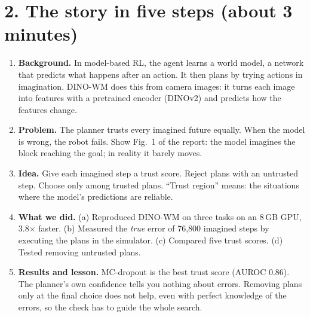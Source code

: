 \documentclass[11pt,a4paper]{article}
\begin{document}
\section*{2. The story in five steps (about 3 minutes)}
\begin{enumerate}
\item \textbf{Background.} In model-based RL, the agent learns a world model, a network that predicts what happens
after an action. It then plans by trying actions in imagination. DINO-WM does this from camera images: it turns each
image into features with a pretrained encoder (DINOv2) and predicts how the features change.
\item \textbf{Problem.} The planner trusts every imagined future equally. When the model is wrong, the robot fails.
Show Fig.~1 of the report: the model imagines the block reaching the goal; in reality it barely moves.
\item \textbf{Idea.} Give each imagined step a trust score. Reject plans with an untrusted step. Choose only among
trusted plans. ``Trust region'' means: the situations where the model's predictions are reliable.
\item \textbf{What we did.} (a) Reproduced DINO-WM on three tasks on an 8\,GB GPU, 3.8$\times$ faster.
(b) Measured the \emph{true} error of 76,800 imagined steps by executing the plans in the simulator.
(c) Compared five trust scores. (d) Tested removing untrusted plans.
\item \textbf{Results and lesson.} MC-dropout is the best trust score (AUROC 0.86). The planner's own confidence tells
you nothing about errors. Removing plans only at the final choice does not help, even with perfect knowledge of the
errors, so the check has to guide the whole search.
\end{enumerate}
\end{document}
